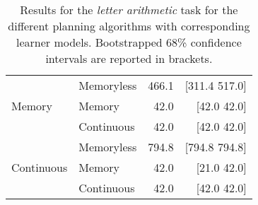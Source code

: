 \begin{table}[h]
\begin{tabular}{ll|rr}
\hline
\multirow{3}{*}{Memory}       & Memoryless      & 466.1 & [311.4 517.0] \\
                                & Memory        &  42.0   & [42.0 42.0]   \\
                                & Continuous    &  42.0   & [42.0 42.0]   \\
\hline
\multirow{3}{*}{Continuous}     & Memoryless    & 794.8 & [794.8 794.8] \\
                                & Memory        &  42.0   & [21.0 42.0]   \\
                                & Continuous    &  42.0   & [42.0 42.0]   \\

\hline
\end{tabular}
\caption{Results for the \textit{letter arithmetic} task for the different planning algorithms with corresponding learner models. Bootstrapped 68\% confidence intervals are reported in brackets.
}
\label{tab:results-t1}
\end{table}

